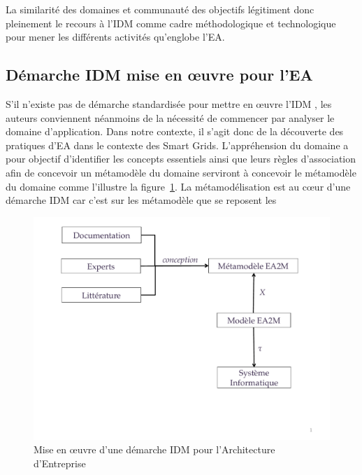     La similarité des domaines et communauté des objectifs légitiment donc pleinement le recours à l'IDM comme cadre
    méthodologique et technologique pour mener  les différents
    activités qu’englobe l'EA.

    \subsection{Démarche IDM mise en œuvre pour l'EA}

    S'il n'existe pas de démarche standardisée pour mettre en œuvre
    l'IDM \cite{barbier13phd}, les auteurs conviennent néanmoins de la
    nécessité  de commencer par analyser le domaine d'application.
    Dans notre contexte, il s'agit donc de la découverte des pratiques
    d'EA dans le contexte des Smart Grids. L’appréhension du domaine a
    pour objectif d'identifier les concepts essentiels ainsi que leurs
    règles d'association afin de concevoir un métamodèle du domaine
    serviront à concevoir le métamodèle du domaine comme l'illustre la
    figure~\ref{fig:demarche_idem}.
    La métamodélisation  est au cœur d'une démarche IDM car c'est sur les métamodèle que se  reposent les 



    \begin{figure}[!ht]

         \begin{center}

        \includegraphics[trim=0cm 4cm 0cm 0cm, width=1\textwidth]{figures/4_demarche/demarche_idm.pdf}

         \end{center}

         \caption{Mise en œuvre d'une démarche IDM pour l'Architecture
         d'Entreprise}

         \label{fig:demarche_idem}

    \end{figure}

